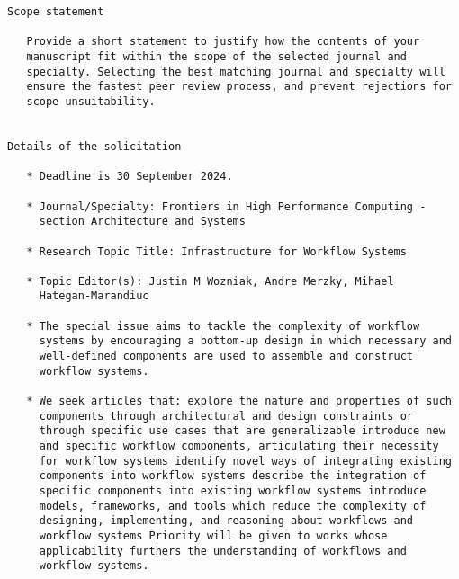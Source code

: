 \begin{verbatim}
Scope statement

   Provide a short statement to justify how the contents of your
   manuscript fit within the scope of the selected journal and
   specialty. Selecting the best matching journal and specialty will
   ensure the fastest peer review process, and prevent rejections for
   scope unsuitability.


Details of the solicitation

   * Deadline is 30 September 2024. 
    
   * Journal/Specialty: Frontiers in High Performance Computing -
     section Architecture and Systems

   * Research Topic Title: Infrastructure for Workflow Systems

   * Topic Editor(s): Justin M Wozniak, Andre Merzky, Mihael
     Hategan-Marandiuc

   * The special issue aims to tackle the complexity of workflow
     systems by encouraging a bottom-up design in which necessary and
     well-defined components are used to assemble and construct
     workflow systems.

   * We seek articles that: explore the nature and properties of such
     components through architectural and design constraints or
     through specific use cases that are generalizable introduce new
     and specific workflow components, articulating their necessity
     for workflow systems identify novel ways of integrating existing
     components into workflow systems describe the integration of
     specific components into existing workflow systems introduce
     models, frameworks, and tools which reduce the complexity of
     designing, implementing, and reasoning about workflows and
     workflow systems Priority will be given to works whose
     applicability furthers the understanding of workflows and
     workflow systems.


\end{verbatim}
